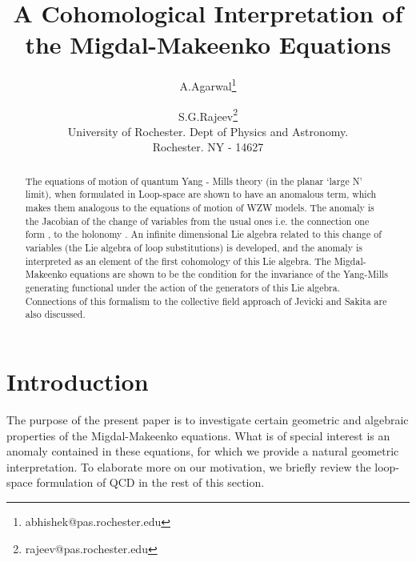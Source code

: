 \documentclass[a4paper,12]{article}
\begin{document}



\title{A Cohomological Interpretation of the Migdal-Makeenko Equations}
\author{A.Agarwal\thanks{abhishek@pas.rochester.edu} \\
\and
 S.G.Rajeev\thanks{rajeev@pas.rochester.edu} \\
University of Rochester. Dept of Physics and Astronomy. \\
Rochester. NY - 14627}
\maketitle


\begin{abstract}
The equations of motion of quantum  Yang - Mills theory (in the planar 
`large N' limit), when formulated 
in Loop-space are shown to have an anomalous term, which makes them 
analogous to the equations of motion of WZW models. The anomaly is 
the Jacobian of the  change of 
 variables from the usual ones i.e. the connection 
one form \coordHE{}, to the holonomy \coordHE{}. An infinite dimensional Lie algebra 
related to this change of variables (the Lie algebra of loop substitutions) 
is developed, and the anomaly  is interpreted as an element of the first 
cohomology of this Lie algebra. The Migdal-Makeenko equations are shown to 
be the condition for the invariance of the Yang-Mills generating 
functional \coordHE{} under the action of the generators of this Lie algebra. Connections of this formalism  to the 
collective field approach 
of Jevicki and Sakita are also discussed. 
\end{abstract}

\section{Introduction}
The purpose of the present paper is to investigate certain geometric and 
algebraic properties of the Migdal-Makeenko equations. What is of special 
interest is an anomaly contained in these equations,  
for which we provide a natural geometric interpretation.  To elaborate 
more on our motivation, we briefly review the loop-space formulation 
of 
QCD in the rest of this section.
\end{document}
